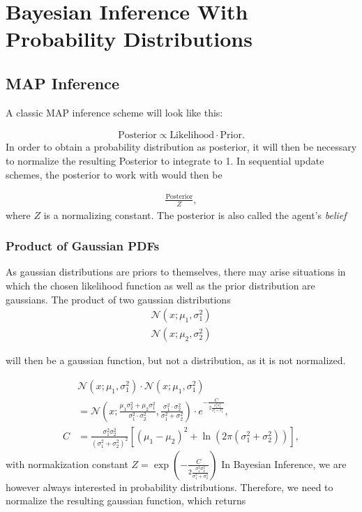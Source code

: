 \chapter{Bayesian Inference With Probability Distributions}
\label{sec:Prob_Distros}

\section{MAP Inference}
A classic MAP inference scheme will look like this:

\begin{align}
\text{Posterior} \propto \text{Likelihood}\cdot \text{Prior}.
\label{eq:MAP}
\end{align}
In order to obtain a probability distribution as posterior, it will then be necessary to normalize the resulting Posterior to integrate to 1. In sequential update schemes, the posterior to work with would then be

\begin{align}
\frac{\text{Posterior}}{Z},
\label{eq:Normalization}
\end{align}
where $Z$ is a normalizing constant. The posterior is also called the agent's \textit{belief}

\subsection{Product of Gaussian PDFs}

As gaussian distributions are priors to themselves, there may arise situations in which the chosen likelihood function as well as the prior distribution are gaussians. The product of two gaussian distributions
\begin{align*}
\mathcal{N}(x;\mu_1,\sigma_1 ^2) \\
\mathcal{N}(x;\mu_2,\sigma_2 ^2)
\end{align*}

will then be a gaussian function, but not a distribution, as it is not normalized. 

\begin{align}
& \mathcal{N}(x;\mu_1,\sigma_1 ^2) \cdot \mathcal{N}(x;\mu_1,\sigma_1 ^2) \\
&= \mathcal{N}(x;\frac{\mu_1 \sigma_2 ^2 +\mu_2 \sigma_1 ^2}{\sigma_1 ^2\cdot \sigma_2 ^2},\frac{\sigma_1 ^2\cdot \sigma_2 ^2}{\sigma_1 ^2+ \sigma_2 ^2})\cdot e^{-\frac{C}{2\frac{\sigma_1^2 \sigma_2^2}{\sigma_1^2 + \sigma_2^2}}}, \\
C & =\frac{\sigma_1^2 \sigma_2^2}{(\sigma_1^2 + \sigma_2^2)^2}\left[ (\mu_1 -\mu_2)^2 +\ln(2\pi(\sigma_1^2 + \sigma_2^2)) \right],
\label{eq:normal_product}
\end{align}
with normakization constant $Z=\exp{\left(-\frac{C}{2\frac{\sigma_1^2 \sigma_2^2}{\sigma_1^2 + \sigma_2^2}}\right) }$
In Bayesian Inference, we are however always interested in probability distributions. Therefore, we need to normalize the resulting gaussian function, which returns

